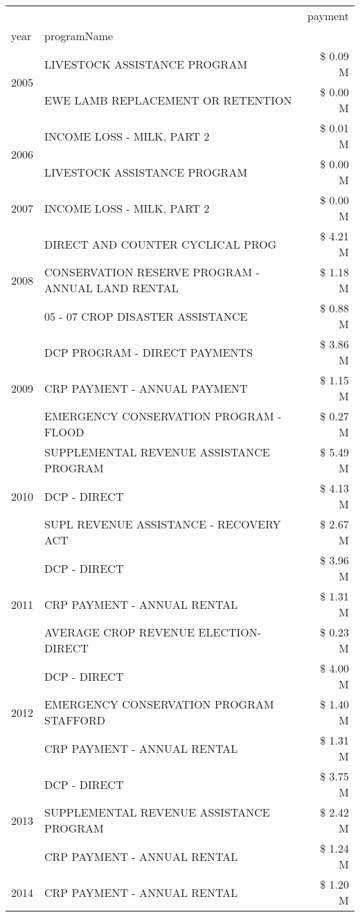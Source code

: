\begin{tabular}{llr}
\toprule
 &  & payment \\
year & programName &  \\
\midrule
\multirow[t]{2}{*}{2005} & LIVESTOCK ASSISTANCE PROGRAM & \$ 0.09 M \\
 & EWE LAMB REPLACEMENT OR RETENTION & \$ 0.00 M \\
\cline{1-3}
\multirow[t]{2}{*}{2006} & INCOME LOSS - MILK, PART 2 & \$ 0.01 M \\
 & LIVESTOCK ASSISTANCE PROGRAM & \$ 0.00 M \\
\cline{1-3}
2007 & INCOME LOSS - MILK, PART 2 & \$ 0.00 M \\
\cline{1-3}
\multirow[t]{3}{*}{2008} & DIRECT AND COUNTER CYCLICAL PROG & \$ 4.21 M \\
 & CONSERVATION RESERVE PROGRAM - ANNUAL LAND RENTAL & \$ 1.18 M \\
 & 05 - 07 CROP DISASTER ASSISTANCE & \$ 0.88 M \\
\cline{1-3}
\multirow[t]{3}{*}{2009} & DCP PROGRAM - DIRECT PAYMENTS & \$ 3.86 M \\
 & CRP PAYMENT - ANNUAL PAYMENT & \$ 1.15 M \\
 & EMERGENCY CONSERVATION PROGRAM - FLOOD & \$ 0.27 M \\
\cline{1-3}
\multirow[t]{3}{*}{2010} & SUPPLEMENTAL REVENUE ASSISTANCE PROGRAM & \$ 5.49 M \\
 & DCP - DIRECT & \$ 4.13 M \\
 & SUPL REVENUE ASSISTANCE - RECOVERY ACT & \$ 2.67 M \\
\cline{1-3}
\multirow[t]{3}{*}{2011} & DCP - DIRECT & \$ 3.96 M \\
 & CRP PAYMENT - ANNUAL RENTAL & \$ 1.31 M \\
 & AVERAGE CROP REVENUE ELECTION-DIRECT & \$ 0.23 M \\
\cline{1-3}
\multirow[t]{3}{*}{2012} & DCP - DIRECT & \$ 4.00 M \\
 & EMERGENCY CONSERVATION PROGRAM STAFFORD & \$ 1.40 M \\
 & CRP PAYMENT - ANNUAL RENTAL & \$ 1.31 M \\
\cline{1-3}
\multirow[t]{3}{*}{2013} & DCP - DIRECT & \$ 3.75 M \\
 & SUPPLEMENTAL REVENUE ASSISTANCE PROGRAM & \$ 2.42 M \\
 & CRP PAYMENT - ANNUAL RENTAL & \$ 1.24 M \\
\cline{1-3}
\multirow[t]{3}{*}{2014} & CRP PAYMENT - ANNUAL RENTAL & \$ 1.20 M \\

\end{tabular}
